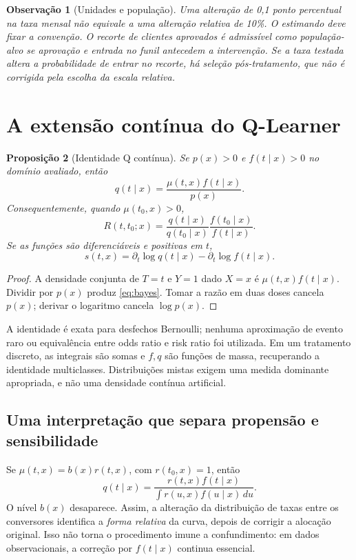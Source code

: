 \documentclass[11pt,a4paper]{article}
\newtheorem{theorem}{Proposição}[section]
\newtheorem{remark}[theorem]{Observação}
\begin{document}
\begin{remark}[Unidades e população]
Uma alteração de 0,1 ponto percentual na taxa mensal não equivale a uma alteração relativa de 10\%. O estimando deve fixar a convenção. O recorte de clientes aprovados é admissível como população-alvo se aprovação e entrada no funil antecedem a intervenção. Se a taxa testada altera a probabilidade de entrar no recorte, há seleção pós-tratamento, que não é corrigida pela escolha da escala relativa.
\end{remark}

\section{A extensão contínua do Q-Learner}
\label{sec:q}
\begin{theorem}[Identidade Q contínua]
\label{prop:bayes}
Se $p(x)>0$ e $f(t\mid x)>0$ no domínio avaliado, então
\begin{equation}
q(t\mid x)=\frac{\mu(t,x)f(t\mid x)}{p(x)}.
\label{eq:bayes}
\end{equation}
Consequentemente, quando $\mu(t_0,x)>0$,
\begin{equation}
\boxed{R(t,t_0;x)=\frac{q(t\mid x)}{q(t_0\mid x)}
                           \frac{f(t_0\mid x)}{f(t\mid x)}.}
\label{eq:qratio}
\end{equation}
Se as funções são diferenciáveis e positivas em $t$,
\begin{equation}
\boxed{s(t,x)=\partial_t\log q(t\mid x)-\partial_t\log f(t\mid x).}
\label{eq:qderiv}
\end{equation}
\end{theorem}
\begin{proof}
A densidade conjunta de $T=t$ e $Y=1$ dado $X=x$ é $\mu(t,x)f(t\mid x)$. Dividir por $p(x)$ produz \eqref{eq:bayes}. Tomar a razão em duas doses cancela $p(x)$; derivar o logaritmo cancela $\log p(x)$.
\end{proof}
A identidade é exata para desfechos Bernoulli; nenhuma aproximação de evento raro ou equivalência entre odds ratio e risk ratio foi utilizada. Em um tratamento discreto, as integrais são somas e $f,q$ são funções de massa, recuperando a identidade multiclasses. Distribuições mistas exigem uma medida dominante apropriada, e não uma densidade contínua artificial.

\subsection{Uma interpretação que separa propensão e sensibilidade}
Se $\mu(t,x)=b(x)r(t,x)$, com $r(t_0,x)=1$, então
\begin{equation}
q(t\mid x)=\frac{r(t,x)f(t\mid x)}{\int r(u,x)f(u\mid x)\,du}.
\label{eq:tilt}
\end{equation}
O nível $b(x)$ desaparece. Assim, a alteração da distribuição de taxas entre os conversores identifica a \emph{forma relativa} da curva, depois de corrigir a alocação original. Isso não torna o procedimento imune a confundimento: em dados observacionais, a correção por $f(t\mid x)$ continua essencial.
\end{document}
